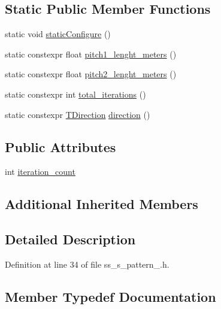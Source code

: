 \subsection*{Static Public Member Functions}
\begin{DoxyCompactItemize}
\item 
static void \hyperlink{structsm__dance__bot__3_1_1SS5_1_1SsSPattern1_a7e388010bca7db8e999d424f5b87d2c4}{static\+Configure} ()
\item 
static constexpr float \hyperlink{structsm__dance__bot__3_1_1SS5_1_1SsSPattern1_ae1ab8de1c53ef34e844e3b9812df69bb}{pitch1\+\_\+lenght\+\_\+meters} ()
\item 
static constexpr float \hyperlink{structsm__dance__bot__3_1_1SS5_1_1SsSPattern1_a1f789b55772fd7504d6a1eeeeb8d2633}{pitch2\+\_\+lenght\+\_\+meters} ()
\item 
static constexpr int \hyperlink{structsm__dance__bot__3_1_1SS5_1_1SsSPattern1_a8df8490a97d4c4704d1c583888d5be23}{total\+\_\+iterations} ()
\item 
static constexpr \hyperlink{namespacesm__dance__bot__3_1_1SS5_afb36760ee122ff90c189fc415cc8daa5}{T\+Direction} \hyperlink{structsm__dance__bot__3_1_1SS5_1_1SsSPattern1_adce5119ce940a1455ab8074e86c98c58}{direction} ()
\end{DoxyCompactItemize}
\subsection*{Public Attributes}
\begin{DoxyCompactItemize}
\item 
int \hyperlink{structsm__dance__bot__3_1_1SS5_1_1SsSPattern1_a4036a16738f35128aae6a1577496c0b5}{iteration\+\_\+count}
\end{DoxyCompactItemize}
\subsection*{Additional Inherited Members}


\subsection{Detailed Description}


Definition at line 34 of file ss\+\_\+s\+\_\+pattern\+\_.\+h.



\subsection{Member Typedef Documentation}

